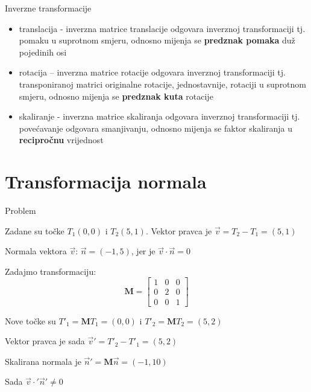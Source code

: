 \documentclass[9pt]{beamer}
\begin{document}
%
\begin{frame}{Inverzne transformacije}
	\begin{itemize}
		\item<1-> translacija - inverzna matrice translacije odgovara inverznoj 
		transformaciji tj. pomaku u suprotnom smjeru, odnosno mijenja se
		\textbf{predznak pomaka} duž pojedinih osi
		\item<2-> rotacija – inverzna matrice rotacije odgovara inverznoj
		transformaciji tj. transponiranoj matrici originalne rotacije, jednostavnije, rotaciji u suprotnom smjeru, odnosno mijenja se \textbf{predznak kuta} rotacije
		\item<3-> skaliranje - inverzna matrice skaliranja odgovara inverznoj
		transformaciji tj. povećavanje odgovara smanjivanju, odnosno
		mijenja se faktor skaliranja u \textbf{recipročnu} vrijednost
	\end{itemize}
\end{frame}

\section{Transformacija normala}
\begin{frame}{Problem}
	
	Zadane su točke $T_1(0,0)$ i $T_2(5,1)$. Vektor pravca je $\vec{v} = T_2 - T_1 = (5,1)$
	
	Normala vektora $\vec{v}$: $\vec{n} = (-1, 5)$, jer je $\vec{v}\cdot\vec{n}=0$
	
	Zadajmo transformaciju: $$\mathbf{M} = \left[\begin{array}{ccc}
	1 & 0& 0 \\
	0 & 2 & 0 \\
	0 & 0 & 1
	\end{array}\right]$$
	
	Nove točke su $T'_1 = \mathbf{M}T_1 = (0,0)$ i $T'_2 = \mathbf{M}T_2=(5, 2)$
	
	Vektor pravca je sada $\vec{v}' = T'_2 - T'_1 = (5,2)$ 
	
	Skalirana normala je $\vec{n}' = \mathbf{M}\vec{n} = (-1, 10)$
	
	Sada $\vec{v}\cdot'\vec{n}'\neq0$
\end{frame}
\end{document}
